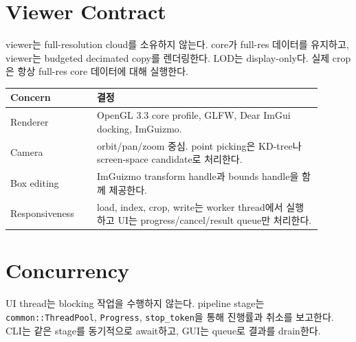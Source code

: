 \section{Viewer Contract}

viewer는 full-resolution cloud를 소유하지 않는다. core가 full-res 데이터를
유지하고, viewer는 budgeted decimated copy를 렌더링한다. LOD는 display-only다.
실제 crop은 항상 full-res core 데이터에 대해 실행한다.

\begin{longtable}{p{0.25\linewidth}p{0.65\linewidth}}
\toprule
\textbf{Concern} & \textbf{결정} \\
\midrule
Renderer & OpenGL 3.3 core profile, GLFW, Dear ImGui docking, ImGuizmo. \\
Camera & orbit/pan/zoom 중심. point picking은 KD-tree나 screen-space candidate로
처리한다. \\
Box editing & ImGuizmo transform handle과 bounds handle을 함께 제공한다. \\
Responsiveness & load, index, crop, write는 worker thread에서 실행하고 UI는
progress/cancel/result queue만 처리한다. \\
\bottomrule
\end{longtable}

\section{Concurrency}

UI thread는 blocking 작업을 수행하지 않는다. pipeline stage는
\texttt{common::ThreadPool}, \texttt{Progress}, \texttt{stop\_token}을 통해
진행률과 취소를 보고한다. CLI는 같은 stage를 동기적으로 await하고, GUI는 queue로
결과를 drain한다.

